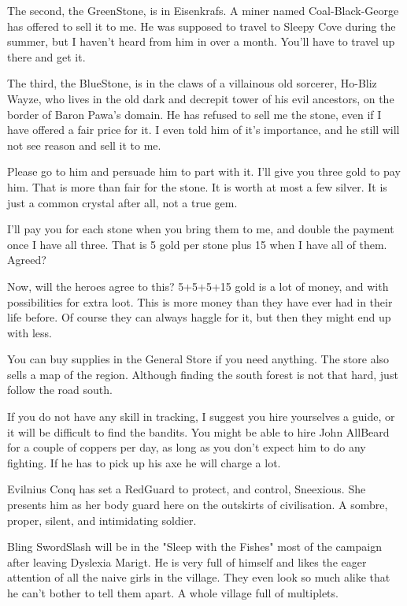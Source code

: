 \begin{readoutloud}
The second, the GreenStone, is in Eisenkrafs. A miner named Coal-Black-George has offered to sell it to me. He was supposed to travel to Sleepy Cove during the summer, but I haven't heard from him in over a month. You'll have to travel up there and get it.

The third, the BlueStone, is in the claws of a villainous old sorcerer, Ho-Bliz Wayze, who lives in the old dark and decrepit tower of his evil ancestors, on the border of Baron Pawa's domain. He has refused to sell me the stone, even if I have offered a fair price for it. I even told him of it's importance, and he still will not see reason and sell it to me.

Please go to him and persuade him to part with it. I'll give you three gold to pay him. That is more than fair for the stone. It is worth at most a few silver. It is just a common crystal after all, not a true gem.

I'll pay you for each stone when you bring them to me, and double the payment once I have all three. That is 5 gold per stone plus 15 when I have all of them. Agreed?
\end{readoutloud}


Now, will the heroes agree to this? 5+5+5+15 gold is a lot of money, and with possibilities for extra loot. This is more money than they have ever had in their life before.
Of course they can always haggle for it, but then they might end up with less.


\begin{readoutloud}
You can buy supplies in the General Store if you need anything. The store also sells a map of the region. Although finding the south forest is not that hard, just follow the road south.

If you do not have any skill in tracking, I suggest you hire yourselves a guide, or it will be difficult to find the bandits. You might be able to hire John AllBeard for a couple of coppers per day, as long as you don't expect him to do any fighting. If he has to pick up his axe he will charge a lot.
\end{readoutloud}


Evilnius Conq has set a RedGuard to protect, and control, Sneexious. She presents him as her body guard here on the outskirts of civilisation. A sombre, proper, silent, and intimidating soldier.


Bling SwordSlash will be in the "Sleep with the Fishes" most of the campaign after leaving Dyslexia Marigt. He is very full of himself and likes the eager attention of all the naive girls in the village. They even look so much alike that he can't bother to tell them apart. A whole village full of multiplets.


